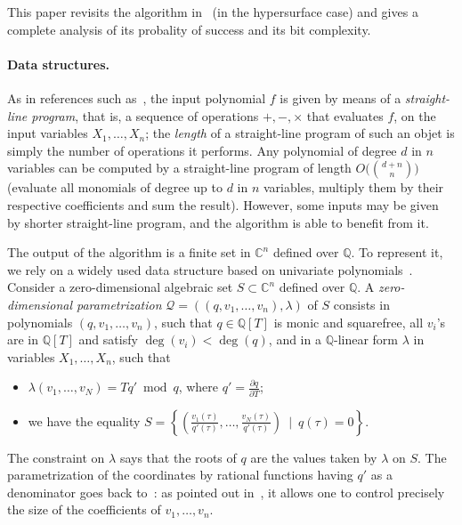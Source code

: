 \documentclass[sigconf]{acmart}
\def\C{\mathbb{C}}
\def\Q{\mathbb{Q}}
\def\scrQ{\ensuremath{\mathscr{Q}}}
\begin{document}
This paper revisits the algorithm in~\cite{EMP} (in the hypersurface
case) and gives a complete analysis of its probality of success and
its bit complexity. 


\paragraph*{Data structures.} As in references such
as~\cite{GiHeMoPa95,GiHaHeMoMoPa97,GiHeMoMoPa98,BaGiHeMb97,EMP}, the
input polynomial $f$ is given by means of a {\em straight-line
  program}, that is, a sequence of operations $+,-,\times$ that
evaluates $f$, on the input variables $X_1,\dots,X_n$; the {\em
  length} of a straight-line program of such an objet is simply the
number of operations it performs. Any polynomial of degree $d$ in $n$
variables can be computed by a straight-line program of length $O\big
({{d+n} \choose n}\big)$ (evaluate all monomials of degree up to $d$
in $n$ variables, multiply them by their respective coefficients and
sum the result). However, some inputs may be given by shorter
straight-line program, and the algorithm is able to benefit from it.

The output of the algorithm is a finite set in $\C^n$ defined over
$\Q$. To represent it, we rely on a widely used data structure based
on univariate
polynomials~\cite{Kronecker82,Macaulay16,GiMo89,GiHeMoPa95,ABRW,GiHaHeMoMoPa97,GiHeMoMoPa98,Rouillier99}.
Consider a zero-dimensional algebraic set $S \subset \C^n$ defined
over $\Q$. A {\em zero-dimensional parametrization}
$\scrQ=((q,v_1,\dots,v_n),\lambda)$ of $S$ consists in polynomials
$(q,v_1,\dots,v_n)$, such that $q\in \Q[T]$ is monic and squarefree,
all $v_i$'s are in $\Q[T]$ and satisfy $\deg(v_i) < \deg(q)$, and in a
$\Q$-linear form $\lambda$ in variables $X_1,\dots,X_n$, such that
\begin{itemize}
\item $\lambda(v_1,\dots,v_N)=T q' \bmod q$, where $q'=\frac{\partial
  q}{\partial T}$;
\item we have the equality
  $S=\left \{\left(
      \frac{v_1(\tau)}{q'(\tau)},\dots,\frac{v_N(\tau)}{q'(\tau)}\right
    ) \ \mid \ q(\tau)=0 \right \}.$
\end{itemize}
The constraint on $\lambda$ says that the roots of $q$ are the values
taken by $\lambda$ on $S$. The parametrization of the coordinates by
rational functions having $q'$ as a denominator goes back
to~\cite{Kronecker82,Macaulay16}: as pointed out in~\cite{ABRW}, it
allows one to control precisely the size of the coefficients of
$v_1,\dots,v_n$.
\end{document}
